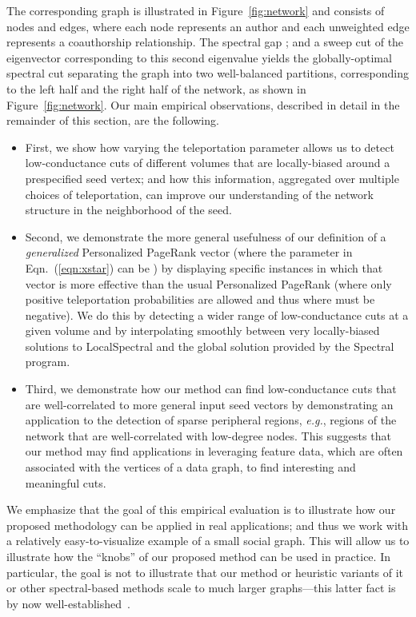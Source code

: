 \documentclass[11pt]{article}
\begin{document}
The corresponding graph  is illustrated in Figure~\ref{fig:network} and
consists of  nodes and  edges, where each node represents an 
author and each unweighted edge represents a coauthorship relationship.
The spectral gap ; and a sweep cut of the eigenvector 
corresponding to this second eigenvalue yields the globally-optimal spectral 
cut separating the graph into two well-balanced partitions, corresponding to 
the left half and the right half of the network, as shown in 
Figure~\ref{fig:network}.
Our main empirical observations, described in detail in the remainder of 
this section, are the following.
\begin{itemize}
\item
First, we show how varying the teleportation parameter allows us to detect 
low-conductance cuts of different volumes that are locally-biased around a 
prespecified seed vertex; and how this information, aggregated over 
multiple choices of teleportation, can improve our understanding of the 
network structure in the neighborhood of the seed.
\item
Second, we demonstrate the more general usefulness of our definition of a 
\emph{generalized} Personalized PageRank vector (where the  
parameter in Eqn.~(\ref{eqn:xstar}) can be ) 
by displaying specific instances in which that vector is more effective than 
the usual Personalized PageRank (where only positive teleportation 
probabilities are allowed and thus where  must be negative).
We do this by detecting a wider range of low-conductance cuts at a given 
volume and by interpolating smoothly between very locally-biased solutions 
to \textsf{LocalSpectral} and the global solution provided by the 
\textsf{Spectral} program.
\item
Third, we demonstrate how our method can find low-conductance cuts that are 
well-correlated to more general input seed vectors by demonstrating an 
application to the detection of sparse peripheral regions, \emph{e.g.}, 
regions of the network that are well-correlated with low-degree nodes.
This suggests that our method may find applications in leveraging 
feature data, which are often associated with the vertices of a 
data graph, to find interesting and meaningful cuts.
\end{itemize}
We emphasize that the goal of this empirical evaluation is to illustrate 
how our proposed methodology can be applied in real applications; and thus 
we work with a relatively easy-to-visualize example of a small social graph.
This will allow us to illustrate how the ``knobs'' of our proposed method 
can be used in practice.
In particular, the goal is not to illustrate that our method or heuristic 
variants of it or other spectral-based methods scale to much larger 
graphs---this latter fact is by now 
well-established~\cite{andersen06seed,LLDM08_communities_CONF,LLDM09_communities_IM,LLM10_communities_CONF}.
\end{document}
